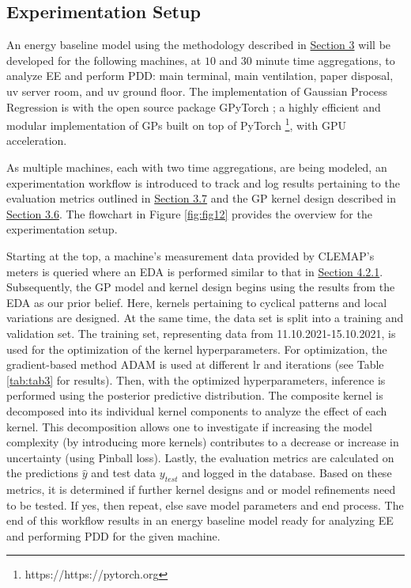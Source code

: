 \subsection{Experimentation Setup}

An energy baseline model using the methodology described in \hyperlink{section.3}{Section 3} will be developed for the following machines, at $10$ and $30$ minute time aggregations, to analyze EE and perform PDD: main terminal, main ventilation, paper disposal, uv server room, and uv ground floor. The implementation of Gaussian Process Regression is with the open source package GPyTorch \cite{gardner2018gpytorch}; a highly efficient and modular implementation of GPs built on top of PyTorch \footnote[2]{https://https://pytorch.org}, with \ac{GPU} acceleration. 

As multiple machines, each with two time aggregations, are being modeled, an experimentation workflow is introduced to track and log results pertaining to the evaluation metrics outlined in \hyperlink{subsection.3.7}{Section 3.7} and the GP kernel design described in \hyperlink{subsection.3.6}{Section 3.6}. The flowchart in Figure \ref{fig:fig12} provides the overview for the experimentation setup. 

Starting at the top, a machine's measurement data provided by CLEMAP's meters is queried where an EDA is performed similar to that in \hyperlink{subsubsection.4.2.1}{Section 4.2.1}. Subsequently, the GP model and kernel design begins using the results from the EDA as our prior belief. Here, kernels pertaining to cyclical patterns and local variations are designed. At the same time, the data set is split into a training and validation set. The training set, representing data from 11.10.2021-15.10.2021, is used for the optimization of the kernel hyperparameters. For optimization, the gradient-based method \ac{ADAM} \cite{pml1Book} is used at different \ac{lr} and iterations (see Table \ref{tab:tab3} for results). Then, with the optimized hyperparameters, inference is performed using the posterior predictive distribution. The composite kernel is decomposed into its individual kernel components to analyze the effect of each kernel. This decomposition allows one to investigate if increasing the model complexity (by introducing more kernels) contributes to a decrease or increase in uncertainty (using Pinball loss). Lastly, the evaluation metrics are calculated on the predictions $\hat{y}$ and test data $y_{test}$ and logged in the database. Based on these metrics, it is determined if further kernel designs and or model refinements need to be tested. If yes, then repeat, else save model parameters and end process. The end of this workflow results in an energy baseline model ready for analyzing EE and performing PDD for the given machine.   

